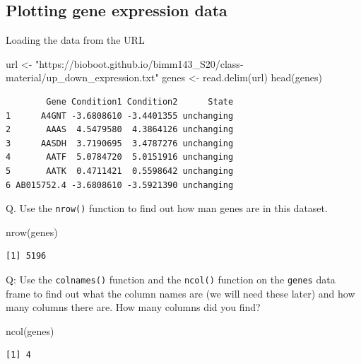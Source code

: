 \documentclass[
  letterpaper,
  DIV=11,
  numbers=noendperiod]{scrartcl}
\newenvironment{Shaded}{\begin{snugshade}}{\end{snugshade}}
\newcommand{\FunctionTok}[1]{\textcolor[rgb]{0.28,0.35,0.67}{#1}}
\newcommand{\NormalTok}[1]{\textcolor[rgb]{0.00,0.23,0.31}{#1}}
\newcommand{\OtherTok}[1]{\textcolor[rgb]{0.00,0.23,0.31}{#1}}
\newcommand{\StringTok}[1]{\textcolor[rgb]{0.13,0.47,0.30}{#1}}
\begin{document}
\hypertarget{plotting-gene-expression-data}{%
\subsection{Plotting gene expression
data}\label{plotting-gene-expression-data}}

Loading the data from the URL

\begin{Shaded}
\begin{Highlighting}[]
\NormalTok{url }\OtherTok{\textless{}{-}} \StringTok{"https://bioboot.github.io/bimm143\_S20/class{-}material/up\_down\_expression.txt"}
\NormalTok{genes }\OtherTok{\textless{}{-}} \FunctionTok{read.delim}\NormalTok{(url)}
\FunctionTok{head}\NormalTok{(genes)}
\end{Highlighting}
\end{Shaded}

\begin{verbatim}
        Gene Condition1 Condition2      State
1      A4GNT -3.6808610 -3.4401355 unchanging
2       AAAS  4.5479580  4.3864126 unchanging
3      AASDH  3.7190695  3.4787276 unchanging
4       AATF  5.0784720  5.0151916 unchanging
5       AATK  0.4711421  0.5598642 unchanging
6 AB015752.4 -3.6808610 -3.5921390 unchanging
\end{verbatim}

Q. Use the \texttt{nrow()} function to find out how man genes are in
this dataset.

\begin{Shaded}
\begin{Highlighting}[]
\FunctionTok{nrow}\NormalTok{(genes)}
\end{Highlighting}
\end{Shaded}

\begin{verbatim}
[1] 5196
\end{verbatim}

Q: Use the \texttt{colnames()} function and the \texttt{ncol()} function
on the \texttt{genes} data frame to find out what the column names are
(we will need these later) and how many columns there are. How many
columns did you find?

\begin{Shaded}
\begin{Highlighting}[]
\FunctionTok{ncol}\NormalTok{(genes)}
\end{Highlighting}
\end{Shaded}

\begin{verbatim}
[1] 4
\end{verbatim}
\end{document}
